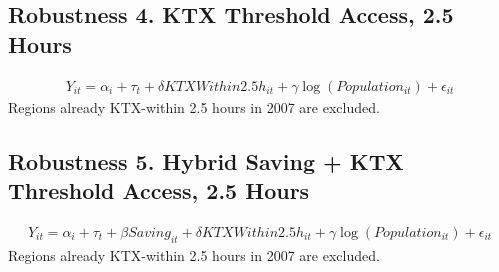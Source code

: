 \documentclass[a4paper, 10pt]{article}
\begin{document}
\begin{table}[H]
\centering
\caption{Robustness 5. Hybrid Saving + KTX Threshold Access, 2 Hours: 의사}

\end{table}

\subsection{Robustness 4. KTX Threshold Access, 2.5 Hours}
\begin{align*}
    Y_{it}=\alpha_i+\tau_t+\delta KTXWithin2.5h_{it}+\gamma\log(Population_{it})+\epsilon_{it}
\end{align*}
Regions already KTX-within 2.5 hours in 2007 are excluded.
\begin{table}[H]
\centering
\caption{Robustness 4. KTX Threshold Access, 2.5 Hours: 의원}

\end{table}

\begin{table}[H]
\centering
\caption{Robustness 4. KTX Threshold Access, 2.5 Hours: 병원}

\end{table}

\begin{table}[H]
\centering
\caption{Robustness 4. KTX Threshold Access, 2.5 Hours: 종합병원}

\end{table}

\begin{table}[H]
\centering
\caption{Robustness 4. KTX Threshold Access, 2.5 Hours: 상급종합병원}

\end{table}

\begin{table}[H]
\centering
\caption{Robustness 4. KTX Threshold Access, 2.5 Hours: 의사}

\end{table}

\subsection{Robustness 5. Hybrid Saving + KTX Threshold Access, 2.5 Hours}
\begin{align*}
    Y_{it}=\alpha_i+\tau_t+\beta Saving_{it}+\delta KTXWithin2.5h_{it}+\gamma\log(Population_{it})+\epsilon_{it}
\end{align*}
Regions already KTX-within 2.5 hours in 2007 are excluded.
\begin{table}[H]
\centering
\caption{Robustness 5. Hybrid Saving + KTX Threshold Access, 2.5 Hours: 의원}

\end{table}
\end{document}
